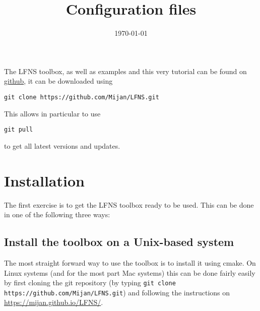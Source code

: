 \documentclass[11pt]{article} %
\title{Configuration files}
\date{\today} %
\begin{document}
The LFNS toolbox, as well as examples and this very tutorial can be found on \href{https://github.com/Mijan/LFNS}{github}, it can be downloaded using 

\begin{tcolorbox}
\begin{verbatim}
git clone https://github.com/Mijan/LFNS.git
\end{verbatim}
\end{tcolorbox}

This allows in particular to use

\begin{tcolorbox}
\begin{verbatim}
git pull
\end{verbatim}
\end{tcolorbox}
 to get all latest versions and updates. 
\section{Installation}
The first exercise is to get the LFNS toolbox ready to be used. This can be done in one of the following three ways: 
\subsection{Install the toolbox on a Unix-based system}
The most straight forward way to use the toolbox is to install it using cmake. On Linux systems (and for the most part Mac systems) this can be done fairly easily by first cloning the git repository (by typing \texttt{git clone https://github.com/Mijan/LFNS.git}) and following the instructions on \href{https://mijan.github.io/LFNS/}{https://mijan.github.io/LFNS/}. 
\end{document}
